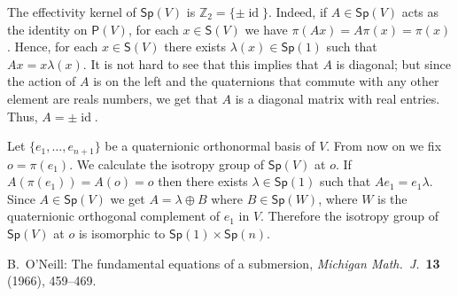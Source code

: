 \documentclass[12pt, a4paper]{amsart}
\newcommand{\id}{\operatorname{id}}
\newcommand{\Sp}{\mathsf{Sp}}
\theoremstyle{remark}
\begin{document}
The effectivity kernel of $\Sp(V)$ is $\mathbb{Z}_2=\{\pm \id\}$.
Indeed, if $A\in\Sp(V)$ acts as the identity on $\mathsf{P}(V)$, for each $x\in\mathsf{S}(V)$ we have 
$\pi(Ax)=A\pi(x)=\pi(x)$.
Hence, for each $x\in\mathsf{S}(V)$ there exists $\lambda(x)\in\Sp(1)$ such that $Ax=x\lambda(x)$.
It is not hard to see that this implies that $A$ is diagonal;
but since the action of $A$ is on the left and the quaternions that commute with any other element are reals numbers, we get that $A$ is a diagonal matrix with real entries.
Thus, $A=\pm\id$.

Let $\{e_1,\dots,e_{n+1}\}$ be a quaternionic orthonormal basis of $V$.
From now on we fix $o=\pi(e_1)$.
We calculate the isotropy group of $\Sp(V)$ at $o$.
If $A(\pi(e_1))=A(o)=o$ then there exists $\lambda\in\Sp(1)$ such that $Ae_1=e_1\lambda$.
Since $A\in\Sp(V)$ we get $A=\lambda\oplus B$ where $B\in\Sp(W)$, where $W$ is the quaternionic orthogonal complement of $e_1$ in $V$.
Therefore the isotropy group of $\Sp(V)$ at $o$ is isomorphic to $\Sp(1)\times\Sp(n)$.


\begin{thebibliography}{99}
B.~O'Neill: The fundamental equations of a submersion, \textit{Michigan Math.\ J.}\ \textbf{13} (1966), 459--469.
\end{thebibliography}
\end{document}
